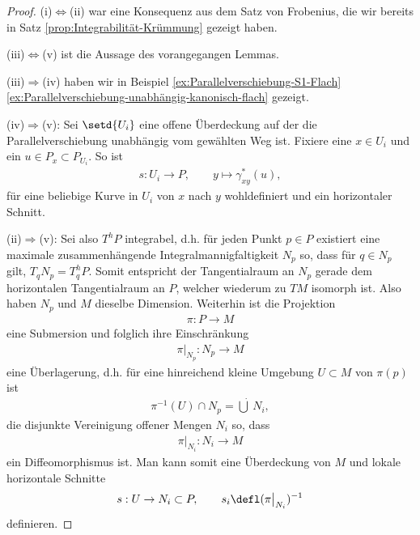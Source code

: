 \documentclass[%
	paper=a5,%
	fleqn,%
	DIV=18,%
	BCOR=0mm,
	fontsize=11pt,
	titlepage=false,%
	bibliography=totoc,
	DIV=18,%
	twoside=true,
	pdftitle=Riemannsche Geometrie,
	pdfauthor=Uwe Semmelmann,
	numbers=noendperiod]%
	{scrbook}
\begin{document}
\begin{proof}
(i)$\iff$(ii) war eine Konsequenz aus dem Satz von Frobenius, die wir bereits in
Satz \ref{prop:Integrabilität-Krümmung} gezeigt haben.

(iii)$\iff$(v) ist die Aussage des vorangegangen
Lemmas.


(iii)$\Rightarrow$(iv) haben wir in Beispiel \ref{ex:Parallelverschiebung-S1-Flach} \ref{ex:Parallelverschiebung-unabhängig-kanonisch-flach} gezeigt.

(iv)$\Rightarrow$(v): Sei $\setd{U_i}$ eine offene Überdeckung auf der die Parallelverschiebung unabhängig vom gewählten Weg ist. Fixiere eine $x\in U_i$ und ein $u\in P_{x}\subset P_{U_i}$. So ist
\begin{align*}
s: U_i \to P,\qquad y \mapsto \gamma_{xy}^*(u),
\end{align*}
für eine beliebige Kurve in $U_i$ von $x$ nach $y$ wohldefiniert und ein horizontaler Schnitt.

(ii)$\Rightarrow$(v): Sei also $T^hP$ integrabel, d.h. für
jeden Punkt $p\in P$ existiert eine maximale zusammenhängende
Integralmannigfaltigkeit $N_p$ so, dass für $q\in N_p$ gilt, $T_qN_p = T_q^hP$.
Somit entspricht der Tangentialraum an $N_p$ gerade dem horizontalen
Tangentialraum an $P$, welcher wiederum zu $TM$ isomorph ist. Also haben $N_p$
und $M$ dieselbe Dimension. Weiterhin ist die Projektion
\begin{align*}
\pi\colon P\to M
\end{align*}
eine Submersion und folglich ihre Einschränkung
\begin{align*}
\pi\big|_{N_p} \colon N_p\to M
\end{align*}
eine Überlagerung, d.h. für eine hinreichend kleine Umgebung $U\subset M$ von
$\pi(p)$ ist
\begin{align*}
\pi^{-1}(U)\cap N_p = \dot{\bigcup}\, N_i,
\end{align*}
die disjunkte Vereinigung offener Mengen $N_i$ so, dass
\begin{align*}
\pi\big|_{N_i} \colon N_i\to M
\end{align*}
ein Diffeomorphismus ist. Man kann somit eine Überdeckung von $M$ und  lokale
horizontale Schnitte
\begin{align*}
s : U\to N_i\subset P,\qquad s_i \defl (\pi\big|_{N_i})^{-1}
\end{align*}
definieren.


\end{proof}
\end{document}
